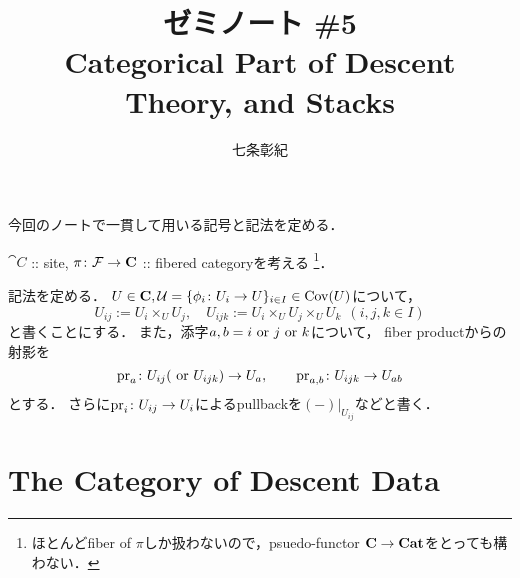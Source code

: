 \documentclass[a4paper]{jsarticle}
\begin{document}
\title{ゼミノート \#5 \\ Categorical Part of Descent Theory, and Stacks}
\author{七条彰紀}
\maketitle

今回のノートで一貫して用いる記号と記法を定める．

$\cat{C}$ :: site, 
$\pi \colon \mathcal{F} \to \mathbf{C}$ :: fibered categoryを考える
\footnote{ ほとんどfiber of $\pi$しか扱わないので，psuedo-functor $\mathbf{C} \to \mathbf{Cat}$をとっても構わない． }．

記法を定める．
$U \in \mathbf{C}, \mathcal{U}=\{\phi_i \colon U_i \to U\}_{i \in I} \in \operatorname{Cov}(U)$について，
\[ U_{ij}:=U_i \times_U U_j, \quad U_{ijk}:=U_i \times_U U_j \times_U U_k \ \ (i,j,k \in I) \]
と書くことにする．
また，添字$a,b=i \text{ or } j \text{ or } k$について，
fiber productからの射影を
\[ \operatorname{pr}_{a} \colon U_{ij} (\text{ or } U_{ijk}) \to U_{a}, \qquad \operatorname{pr}_{a,b} \colon U_{ijk} \to U_{ab} \]
とする．
さらに$\operatorname{pr}_{i} \colon U_{ij} \to U_{i}$によるpullbackを$(-)|_{U_{ij}}$などと書く．

\section{The Category of Descent Data}
\end{document}
